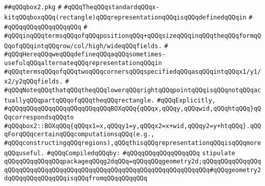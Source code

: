 \label{src/lib/x-kit/draw/box2.pkg}
\verb|##qQQqbox2.pkg|\newline
\verb|#|\newline
\verb|#qQQqTheqQQqstandardqQQqx-kitqQQqboxqQQq(rectangle)qQQqrepresentationqQQqisqQQqdefinedqQQqin|\newline
\verb|#|\newline
\verb|#qQQqqQQqqQQqqQQqqQQq|\newline
\verb|#|\newline
\verb|#qQQqinqQQqtermsqQQqofqQQqpositionqQQq+qQQqsizeqQQqinqQQqtheqQQqformqQQqofqQQqintqQQqrow/col/high/wideqQQqfields.|\newline
\verb|#|\newline
\verb|#qQQqHereqQQqweqQQqdefineqQQqaqQQqsometimes-usefulqQQqalternateqQQqrepresentationqQQqin|\newline
\verb|#qQQqtermsqQQqofqQQqtwoqQQqcornersqQQqspecifiedqQQqasqQQqintqQQqx1/y1/x2/y2qQQqfields.|\newline
\verb|#|\newline
\verb|#qQQqNoteqQQqthatqQQqtheqQQqlowerqQQqrightqQQqpointqQQqisqQQqnotqQQqactuallyqQQqpartqQQqofqQQqtheqQQqrectangle.|\newline
\verb|#qQQqExplicitly,|\newline
\verb|#qQQqqQQqqQQqqQQqqQQqqQQqqQQqBOXqQQq{qQQqx,qQQqy,qQQqwid,qQQqhtqQQq}qQQqcorrespondsqQQqto|\newline
\verb|#qQQqbox2::BOXqQQq{qQQqx1=x,qQQqy1=y,qQQqx2=x+wid,qQQqy2=y+htqQQq}.qQQqForqQQqcertainqQQqcomputationsqQQq(e.g.,|\newline
\verb|#qQQqconstructingqQQqregions),qQQqthisqQQqrepresentationqQQqisqQQqmoreqQQquseful.|\newline
\newline
\verb|#qQQqCompiledqQQqby:|\newline
\verb|#qQQqqQQqqQQqqQQqqQQq|\newline
\newline
\newline
\verb|stipulate|\newline
\verb|qQQqqQQqqQQqqQQqpackageqQQqg2dqQQq=qQQqqQQqgeometry2d;qQQqqQQqqQQqqQQqqQQqqQQqqQQqqQQqqQQqqQQqqQQqqQQqqQQqqQQqqQQqqQQqqQQqqQQq#qQQqgeometry2dqQQqqQQqqQQqqQQqisqQQqfromqQQqqQQqqQQq|\newline
